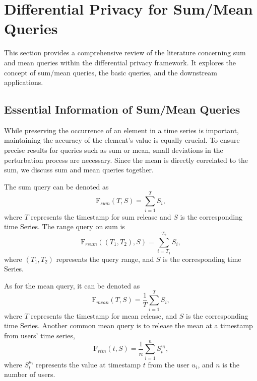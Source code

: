\section{Differential Privacy for Sum/Mean Queries}\label{sec4}
This section provides a comprehensive review of the literature concerning sum and mean queries within the differential privacy framework. It explores the concept of sum/mean queries, the basic queries, and the downstream applications.
\subsection{Essential Information of Sum/Mean Queries}
While preserving the occurrence of an element in a time series is important, maintaining the accuracy of the element's value is equally crucial. To ensure precise results for queries such as sum or mean, small deviations in the perturbation process are necessary. Since the mean is directly correlated to the sum, we discuss sum and mean queries together.

The sum query can be denoted as 
\begin{equation}\nonumber
	\mathrm{F}_{sum}(T, S)=\sum_{i=1}^{T}S_i,
\end{equation}
where $T$ represents the timestamp for sum release and $S$ is the corresponding time Series. The range query on sum is 
\begin{equation}\nonumber
	\mathrm{F}_{rsum}((T_1, T_2), S)=\sum_{i=T_1}^{T_2}S_i,
\end{equation}
where $(T_1, T_2)$ represents the query range, and $S$ is the corresponding time Series.

As for the mean query, it can be denoted as
\begin{equation}\nonumber
	\mathrm{F}_{mean}(T, S)=\frac{1}{T}\sum_{i=1}^{T}S_i,
\end{equation}
where $T$ represents the timestamp for mean release, and $S$ is the corresponding time Series.
Another common mean query is to release the mean at a timestamp from users' time series, 
\begin{equation}\nonumber
	\mathrm{F}_{rtm}(t, S)=\frac{1}{n}\sum_{i=1}^{n}S_t^{u_i},
\end{equation}
where $S_t^{u_i}$ represents the value at timestamp $t$ from the user $u_i$, and $n$ is the number of users.



